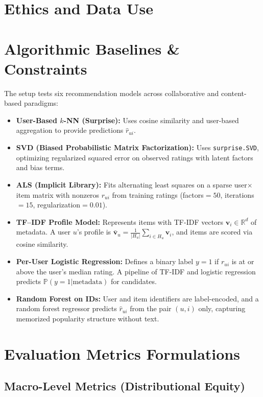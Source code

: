 \documentclass[11pt,a4paper]{report}
\newcommand{\R}{\mathbb{R}}
\begin{document}
\section{Ethics and Data Use}

\section{Algorithmic Baselines \& Constraints}
The setup tests six recommendation models across collaborative and content-based paradigms:

\begin{itemize}
    \item \textbf{User-Based $k$-NN (Surprise):} Uses cosine similarity and user-based aggregation to provide predictions $\hat{r}_{ui}$.
    \item \textbf{SVD (Biased Probabilistic Matrix Factorization):} Uses \texttt{surprise.SVD}, optimizing regularized squared error on observed ratings with latent factors and bias terms.
    \item \textbf{ALS (Implicit Library):} Fits alternating least squares on a sparse user$\times$item matrix with nonzeros $r_{ui}$ from training ratings (factors$=50$, iterations$=15$, regularization$=0.01$).
    \item \textbf{TF--IDF Profile Model:} Represents items with TF-IDF vectors $\bm{v}_i \in \R^d$ of metadata. A user $u$'s profile is $\bar{\bm{v}}_u = \frac{1}{|H_u|} \sum_{i \in H_u} \bm{v}_i$, and items are scored via cosine similarity.
    \item \textbf{Per-User Logistic Regression:} Defines a binary label $y=1$ if $r_{ui}$ is at or above the user's median rating. A pipeline of TF-IDF and logistic regression predicts $\mathbb{P}(y=1|\text{metadata})$ for candidates.
    \item \textbf{Random Forest on IDs:} User and item identifiers are label-encoded, and a random forest regressor predicts $\hat{r}_{ui}$ from the pair $(u,i)$ only, capturing memorized popularity structure without text.
\end{itemize}

\section{Evaluation Metrics Formulations}

\subsection{Macro-Level Metrics (Distributional Equity)}
\end{document}
